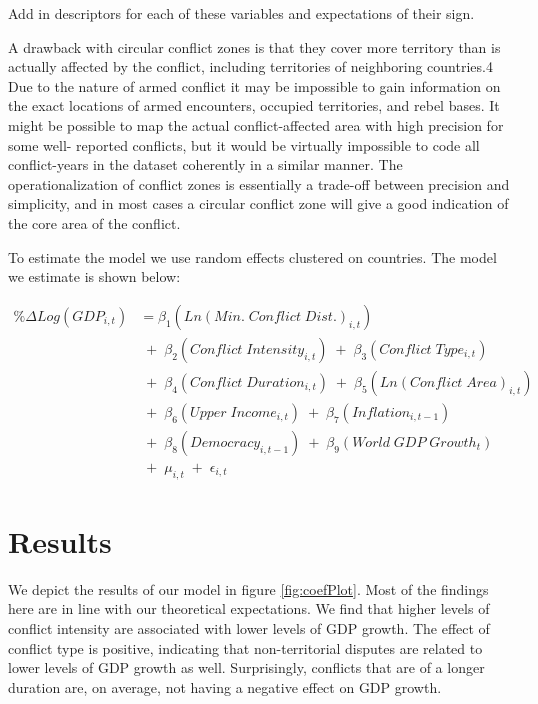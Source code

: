 Add in descriptors for each of these variables and expectations of their sign.

A drawback with circular conflict zones is that they cover more territory than is actually affected by the conflict, including territories of neighboring countries.4 Due to the nature of armed conflict it may be impossible to gain information on the exact locations of armed encounters, occupied territories, and rebel bases. It might be possible to map the actual conflict-affected area with high precision for some well- reported conflicts, but it would be virtually impossible to code all conflict-years in the dataset coherently in a similar manner. The operationalization of conflict zones is essentially a trade-off between precision and simplicity, and in most cases a circular conflict zone will give a good indication of the core area of the conflict.

To estimate the model we use random effects clustered on countries. The model we estimate is shown below:

\begin{align*}
	\% \Delta Log(GDP_{i,t}) &= \beta_{1}(Ln(Min. \; Conflict \; Dist.)_{i,t}) \\
	& \;+\; \beta_{2}(Conflict \; Intensity_{i,t}) \;+\; \beta_{3}(Conflict \; Type_{i,t}) \\
	& \;+\; \beta_{4}(Conflict \; Duration_{i,t}) \;+\; \beta_{5}(Ln(Conflict \; Area)_{i,t}) \\	
	& \;+\; \beta_{6}(Upper \; Income_{i,t}) \;+\; \beta_{7}(Inflation_{i,t-1}) \\
	&  \;+\; \beta_{8}(Democracy_{i,t-1}) \;+\; \beta_{9}(World \; GDP \; Growth_{t}) \\
	& \;+\; \mu_{i,t} \;+\; \epsilon_{i,t}
\end{align*}

\section{Results}
\label{findings} 

We depict the results of our model in figure \ref{fig:coefPlot}. Most of the findings here are in line with our theoretical expectations. We find that higher levels of conflict intensity are associated with lower levels of GDP growth. The effect of conflict type is positive, indicating that non-territorial disputes are related to lower levels of GDP growth as well. Surprisingly, conflicts that are of a longer duration are, on average, not having a negative effect on GDP growth. 

